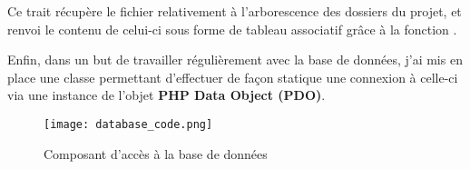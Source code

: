 \newpage

Ce trait récupère le fichier  relativement à l’arborescence des dossiers du projet, et renvoi le contenu de celui-ci sous forme de tableau associatif grâce à la fonction .

Enfin, dans un but de travailler régulièrement avec la base de données, j’ai mis en place une classe  permettant d’effectuer de façon statique une connexion à celle-ci via une instance de l’objet \textbf{PHP Data Object (PDO)}.

\vspace{2cm}

\begin{figure}[!h]
    \centering
    \texttt{[image: database\_code.png]}
    \caption{Composant d'accès à la base de données}
\end{figure}

\newpage
